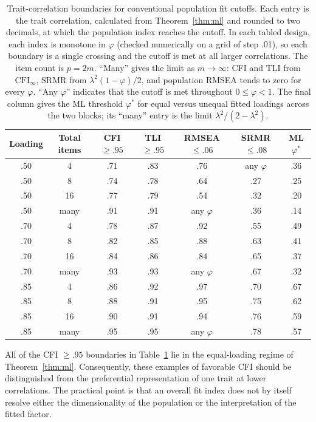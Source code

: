 \begin{table}[t]
\centering\small
\caption{Trait-correlation boundaries for conventional population fit cutoffs. Each entry is the trait correlation, calculated from Theorem~\ref{thm:ml} and rounded to two decimals, at which the population index reaches the cutoff. In each tabled design, each index is monotone in $\varphi$ (checked numerically on a grid of step .01), so each boundary is a single crossing and the cutoff is met at all larger correlations. The item count is $p=2m$. ``Many'' gives the limit as $m\to\infty$: CFI and TLI from $\mathrm{CFI}_\infty$, SRMR from $\lambda^2(1-\varphi)/2$, and population RMSEA tends to zero for every $\varphi$. ``Any $\varphi$'' indicates that the cutoff is met throughout $0\le\varphi<1$. The final column gives the ML threshold $\varphi^*$ for equal versus unequal fitted loadings across the two blocks; its ``many'' entry is the limit $\lambda^2/(2-\lambda^2)$.}
\label{tab:1}
\begin{tabular}{ccccccc}
\toprule
Loading & Total items & CFI $\ge .95$ & TLI $\ge .95$ & RMSEA $\le .06$ & SRMR $\le .08$ & ML $\varphi^*$ \\
\midrule
.50 & 4 & .71 & .83 & .76 & any $\varphi$ & .36 \\
.50 & 8 & .74 & .78 & .64 & .27 & .25 \\
.50 & 16 & .77 & .79 & .54 & .32 & .20 \\
.50 & many & .91 & .91 & any $\varphi$ & .36 & .14 \\
.70 & 4 & .78 & .87 & .92 & .55 & .49 \\
.70 & 8 & .82 & .85 & .88 & .63 & .41 \\
.70 & 16 & .84 & .86 & .84 & .65 & .37 \\
.70 & many & .93 & .93 & any $\varphi$ & .67 & .32 \\
.85 & 4 & .86 & .92 & .97 & .70 & .67 \\
.85 & 8 & .88 & .91 & .95 & .75 & .62 \\
.85 & 16 & .90 & .91 & .94 & .76 & .59 \\
.85 & many & .95 & .95 & any $\varphi$ & .78 & .57 \\
\bottomrule
\end{tabular}
\end{table}

All of the CFI $\ge .95$ boundaries in Table~\ref{tab:1} lie in the equal-loading regime of Theorem~\ref{thm:ml}. Consequently, these examples of favorable CFI should be distinguished from the preferential representation of one trait at lower correlations. The practical point is that an overall fit index does not by itself resolve either the dimensionality of the population or the interpretation of the fitted factor.


